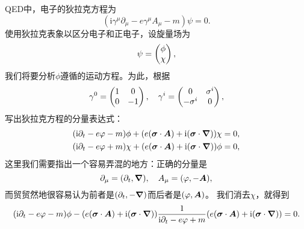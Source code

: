 \documentclass[hyperref, UTF8, a4paper]{ctexart}
\newcommand*{\ii}{\mathrm{i}}
\begin{document}
QED中，电子的狄拉克方程为
\[
    (\ii \gamma^\mu \partial_\mu - e \gamma^\mu A_\mu - m) \psi = 0.
\]
使用狄拉克表象以区分电子和正电子，设旋量场为
\[
    \psi = \pmqty{\phi \\ \chi},
\]
我们将要分析$\phi$遵循的运动方程。为此，根据
\[
    \gamma^0 = \pmqty{1 & 0 \\ 0 & -1}, \quad \gamma^i = \pmqty{0 & \sigma^i \\ - \sigma^i & 0},
\]
写出狄拉克方程的分量表达式：
\[
    \begin{aligned}
        (\ii \partial_t - e \varphi - m) \phi + (e (\vb*{\sigma} \cdot \vb*{A}) + \ii (\vb*{\sigma} \cdot \grad)) \chi &= 0, \\
        (\ii \partial_t - e \varphi + m) \chi + (e (\vb*{\sigma} \cdot \vb*{A}) + \ii (\vb*{\sigma} \cdot \grad)) \phi &= 0,
    \end{aligned}
\]
这里我们需要指出一个容易弄混的地方：正确的分量是
\[
    \partial_\mu = (\partial_t, \grad), \quad A_\mu = (\varphi, - \vb*{A}),
\]
而贸贸然地很容易认为前者是$(\partial_t, -\grad)$而后者是$(\varphi, \vb*{A})$。
我们消去$\chi$，就得到
\begin{equation}
    (\ii \partial_t - e \varphi - m) \phi - (e (\vb*{\sigma} \cdot \vb*{A}) + \ii (\vb*{\sigma} \cdot \grad)) \frac{1}{\ii \partial_t - e \varphi + m} (e (\vb*{\sigma} \cdot \vb*{A}) + \ii (\vb*{\sigma} \cdot \grad)) = 0.
    \label{eq:electron-only}
\end{equation}
\end{document}

